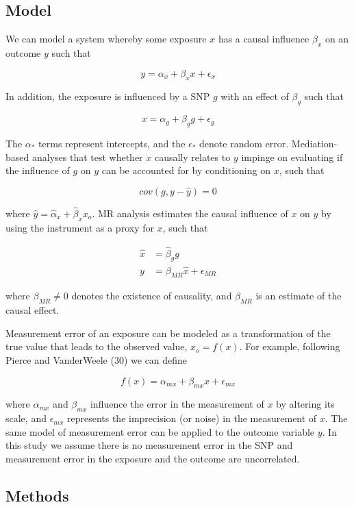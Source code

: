 \documentclass[]{article}
\begin{document}
\subsection{Model}\label{model}

We can model a system whereby some exposure \(x\) has a causal influence
\(\beta_x\) on an outcome \(y\) such that

\[
y = \alpha_x + \beta_x x + \epsilon_x
\]

In addition, the exposure is influenced by a SNP \(g\) with an effect of
\(\beta_g\) such that

\[
x = \alpha_g + \beta_g g + \epsilon_g
\]

The \(\alpha_*\) terms represent intercepts, and the \(\epsilon_*\)
denote random error. Mediation-based analyses that test whether \(x\)
causally relates to \(y\) impinge on evaluating if the influence of
\(g\) on \(y\) can be accounted for by conditioning on \(x\), such that

\[
cov(g, y - \hat{y}) = 0
\]

where \(\hat{y} = \hat{\alpha}_x + \hat{\beta}_x x_o\). MR analysis
estimates the causal influence of \(x\) on \(y\) by using the instrument
as a proxy for \(x\), such that

\[
\begin{aligned}
\hat{x} & = \hat{\beta}_g g \\
y & = \beta_{MR}\hat{x} + \epsilon_{MR}
\end{aligned}
\]

where \(\beta_{MR} \neq 0\) denotes the existence of causality, and
\(\beta_{MR}\) is an estimate of the causal effect.

Measurement error of an exposure can be modeled as a transformation of
the true value that leads to the observed value, \(x_o = f(x)\). For
example, following Pierce and VanderWeele (30) we can define

\[
f(x) = \alpha_{mx} + \beta_{mx} x + \epsilon_{mx}
\]

where \(\alpha_{mx}\) and \(\beta_{mx}\) influence the error in the
measurement of \(x\) by altering its scale, and \(\epsilon_{mx}\)
represents the imprecision (or noise) in the measurement of \(x\). The
same model of measurement error can be applied to the outcome variable
\(y\). In this study we assume there is no measurement error in the SNP
and measurement error in the exposure and the outcome are uncorrelated.

\subsection{Methods}\label{methods}
\end{document}
